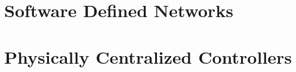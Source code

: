 
\section{Software Defined Networks}
\glsresetall
\label{sec:background:sdn}

\section{Physically Centralized Controllers}
\glsresetall
\label{sec:background:centralized}
